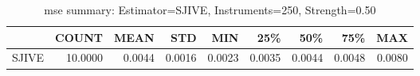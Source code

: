 \begin{table}[ht]
\centering
\caption{mse summary: Estimator=SJIVE, Instruments=250, Strength=0.50}
\begin{tabular}{lrrrrrrrr}
\toprule
 & COUNT & MEAN & STD & MIN & 25\% & 50\% & 75\% & MAX \\
\midrule
SJIVE & 10.0000 & 0.0044 & 0.0016 & 0.0023 & 0.0035 & 0.0044 & 0.0048 & 0.0080 \\
\bottomrule
\end{tabular}
\end{table}
